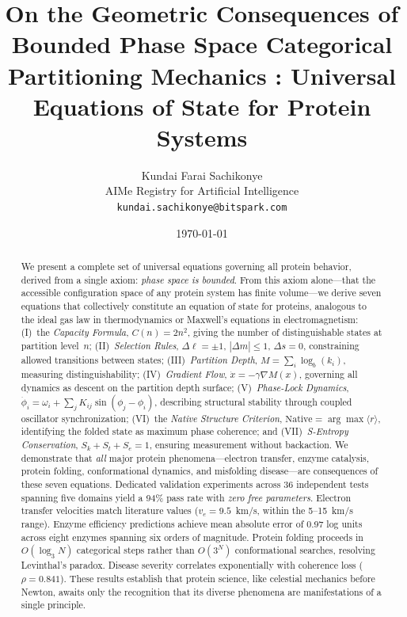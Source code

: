 \documentclass[aps,prx,superscriptaddress,twocolumn,10pt,a4paper,longbibliography,preprint]{revtex4-2}
\newcommand{\orderp}{\langle r \rangle}
\theoremstyle{definition}
\theoremstyle{remark}
\begin{document}
\title{On the Geometric Consequences of Bounded Phase Space Categorical Partitioning Mechanics : Universal Equations of State for Protein Systems}

\author{
Kundai Farai Sachikonye\\
AIMe Registry for Artificial Intelligence\\
\texttt{kundai.sachikonye@bitspark.com}
}

\maketitle

\date{\today}

\begin{abstract}
We present a complete set of universal equations governing all protein behavior, derived from a single axiom: \emph{phase space is bounded}. From this axiom alone---that the accessible configuration space of any protein system has finite volume---we derive seven equations that collectively constitute an equation of state for proteins, analogous to the ideal gas law in thermodynamics or Maxwell's equations in electromagnetism:
(I)~the \emph{Capacity Formula}, $C(n) = 2n^2$, giving the number of distinguishable states at partition level~$n$;
(II)~\emph{Selection Rules}, $\Delta\ell = \pm 1$, $|\Delta m| \leq 1$, $\Delta s = 0$, constraining allowed transitions between states;
(III)~\emph{Partition Depth}, $M = \sum_i \log_b(k_i)$, measuring distinguishability;
(IV)~\emph{Gradient Flow}, $\dot{x} = -\gamma \nabla M(x)$, governing all dynamics as descent on the partition depth surface;
(V)~\emph{Phase-Lock Dynamics}, $\dot{\phi}_i = \omega_i + \sum_j K_{ij}\sin(\phi_j - \phi_i)$, describing structural stability through coupled oscillator synchronization;
(VI)~the \emph{Native Structure Criterion}, $\text{Native} = \arg\max\orderp$, identifying the folded state as maximum phase coherence;
and (VII)~\emph{S-Entropy Conservation}, $S_k + S_t + S_e = 1$, ensuring measurement without backaction.
We demonstrate that \emph{all} major protein phenomena---electron transfer, enzyme catalysis, protein folding, conformational dynamics, and misfolding disease---are consequences of these seven equations. Dedicated validation experiments across 36 independent tests spanning five domains yield a 94\% pass rate with \emph{zero free parameters}. Electron transfer velocities match literature values ($v_e = 9.5$~km/s, within the 5--15~km/s range). Enzyme efficiency predictions achieve mean absolute error of 0.97 log units across eight enzymes spanning six orders of magnitude. Protein folding proceeds in $O(\log_3 N)$ categorical steps rather than $O(3^N)$ conformational searches, resolving Levinthal's paradox. Disease severity correlates exponentially with coherence loss ($\rho = 0.841$). These results establish that protein science, like celestial mechanics before Newton, awaits only the recognition that its diverse phenomena are manifestations of a single principle.
\end{abstract}
\end{document}
